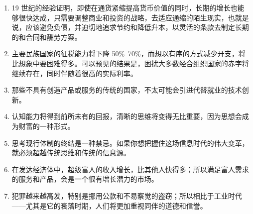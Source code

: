 \begin{enumerate}
    \item 19 世纪的经验证明，即使在通货紧缩提高货币价值的同时，长期的增长也能够很快达成，只需要调整商业和投资的战略，去适应通缩的陌生现实，也就是说，应该避免负债，并迫切地追求节约和降低升本，以灵活的条款去制定长期的和合同和酬劳方案。
    \item 主要民族国家的征税能力将下降 50\%~70\%，而想以有序的方式减少开支，将比想象中要困难得多。可以预见的结果是，困扰大多数经合组织国家的赤字将继续存在，同时伴随着很高的实际利率。
    \item 那些不具有创造产品或服务的传统的国家，不太可能会引进代替就业的技术创新。
    \item 认知能力将得到前所未有的回报，清晰的思维将变得无比重要，因为思想会成为财富的一种形式。
    \item 思考现行体制的终结是一种禁忌。如果你想把握住这场信息时代的伟大变革，就必须超越传统思维和传统的信息源。
    \item 在发达经济体中，超级富人的收入增长，比其他人快得多；所以满足富人需求的服务和产品，会是一个很有增长潜力的市场。
    \item 犯罪越来越高发，特别是挪用公款和不易察觉的盗窃；所以相比于工业时代——尤其是它的衰落时期，人们将更加重视同伴的道德和信誉。
\end{enumerate}

\let\cleardoublepage\clearpage